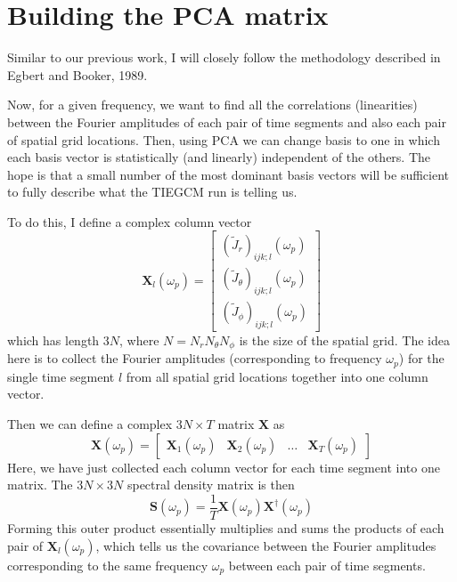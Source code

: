 \documentclass{article}
\begin{document}
\section{Building the PCA matrix}

\noindent
Similar to our previous work, I will closely follow the methodology described in Egbert and Booker, 1989.

\vspace{5 mm}
\noindent
Now, for a given frequency, we want to find all the correlations (linearities) between the Fourier
amplitudes of each pair of time segments and also each pair of spatial grid locations. Then, using
PCA we can change basis to one in which each basis vector is statistically (and linearly) independent
of the others. The hope is that a small number of the most dominant basis vectors will be
sufficient to fully describe what the TIEGCM run is telling us.

\noindent
To do this, I define a complex column vector
\begin{equation}
\mathbf{X}_l(\omega_p) =
\left[
\begin{array}{c}
(\tilde{J}_r)_{ijk;l}(\omega_p) \\
(\tilde{J}_{\theta})_{ijk;l}(\omega_p) \\
(\tilde{J}_{\phi})_{ijk;l}(\omega_p)
\end{array}
\right]
\end{equation}
which has length $3 N$, where $N = N_r N_{\theta} N_{\phi}$ is the size of the
spatial grid. The idea here is to collect the Fourier amplitudes (corresponding
to frequency $\omega_p$) for the single time segment $l$ from all spatial grid
locations together into one column vector.

\noindent
Then we can define a complex $3N \times T$ matrix $\mathbf{X}$ as
\begin{equation}
\mathbf{X}(\omega_p) =
\left[
\begin{array}{cccc}
\mathbf{X}_1(\omega_p) & \mathbf{X}_2(\omega_p) & \dots & \mathbf{X}_T(\omega_p)
\end{array}
\right]
\end{equation}
Here, we have just collected each column vector for each time segment into one matrix.
The $3N \times 3N$ spectral density matrix is then
\begin{equation}
\mathbf{S}(\omega_p) = \frac{1}{T} \mathbf{X}(\omega_p) \mathbf{X}^{\dag}(\omega_p)
\end{equation}
Forming this outer product essentially multiplies and sums the products of each
pair of $\mathbf{X}_l(\omega_p)$, which tells us the covariance between the Fourier amplitudes
corresponding to the same frequency $\omega_p$ between each pair of time segments.
\end{document}
